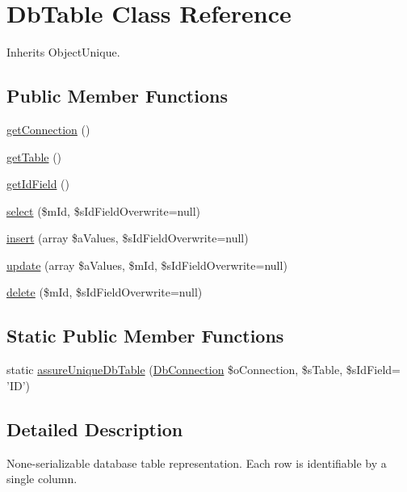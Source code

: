 \hypertarget{class_db_table}{\section{Db\-Table Class Reference}
\label{class_db_table}
}


Inherits Object\-Unique.

\subsection*{Public Member Functions}
\begin{DoxyCompactItemize}
\item 
\hyperlink{class_db_table_a5fbb264a4424d8450832fedc9b862bbc}{get\-Connection} ()
\item 
\hyperlink{class_db_table_a0fc18d6ecd6b2189d5ed239f19e08129}{get\-Table} ()
\item 
\hyperlink{class_db_table_ab1c8088aa73836eb9e5780ad734934fb}{get\-Id\-Field} ()
\item 
\hyperlink{class_db_table_a334c5f7b00fa6f0f0de832c086af4932}{select} (\$m\-Id, \$s\-Id\-Field\-Overwrite=null)
\item 
\hyperlink{class_db_table_a502d0b717d38a4ed5a6f0160ad412f3e}{insert} (array \$a\-Values, \$s\-Id\-Field\-Overwrite=null)
\item 
\hyperlink{class_db_table_af8d3df2720582fd6394f2eaf955030a6}{update} (array \$a\-Values, \$m\-Id, \$s\-Id\-Field\-Overwrite=null)
\item 
\hyperlink{class_db_table_af99ee163b2d017473d9cf9597fecb402}{delete} (\$m\-Id, \$s\-Id\-Field\-Overwrite=null)
\end{DoxyCompactItemize}
\subsection*{Static Public Member Functions}
\begin{DoxyCompactItemize}
\item 
static \hyperlink{class_db_table_af6489f03cec45214d6bf71d6b41c921c}{assure\-Unique\-Db\-Table} (\hyperlink{class_db_connection}{Db\-Connection} \$o\-Connection, \$s\-Table, \$s\-Id\-Field= 'I\-D')
\end{DoxyCompactItemize}


\subsection{Detailed Description}
None-\/serializable database table representation. Each row is identifiable by a single column.


